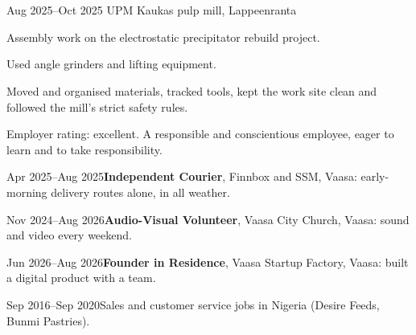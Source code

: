 \documentclass[a4paper,11pt]{article}
\begin{document}
\section{}
\begin{cventry}{Aug 2025--Oct 2025}{}
  UPM Kaukas pulp mill, Lappeenranta\par
  Assembly work on the electrostatic precipitator rebuild project.\par
  Used angle grinders and lifting equipment.\par
  Moved and organised materials, tracked tools, kept the work site clean and followed the mill's strict safety rules.\par
  Employer rating: excellent. A responsible and conscientious employee, eager to learn and to take responsibility.
\end{cventry}
\begin{cventry}{Apr 2025--Aug 2025}{\textbf{Independent Courier}, Finnbox and SSM, Vaasa: early-morning delivery routes alone, in all weather.}
\end{cventry}
\begin{cventry}{Nov 2024--Aug 2026}{\textbf{Audio-Visual Volunteer}, Vaasa City Church, Vaasa: sound and video every weekend.}
\end{cventry}
\begin{cventry}{Jun 2026--Aug 2026}{\textbf{Founder in Residence}, Vaasa Startup Factory, Vaasa: built a digital product with a team.}
\end{cventry}
\begin{cventry}{Sep 2016--Sep 2020}{Sales and customer service jobs in Nigeria (Desire Feeds, Bunmi Pastries).}
\end{cventry}

\section{}

\section{}
\end{document}
